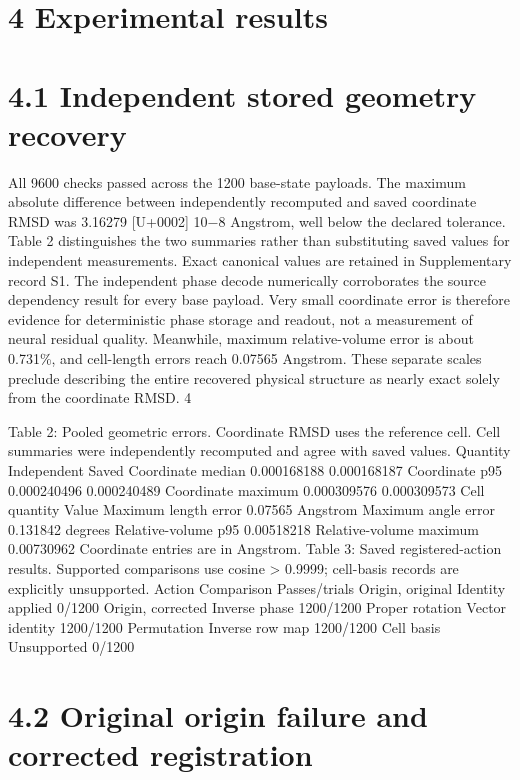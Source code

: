 \documentclass[11pt]{article}
\begin{document}
\section*{4 Experimental results}


\section*{4.1 Independent stored geometry recovery}

All 9600 checks passed across the 1200 base-state payloads. The maximum absolute difference
between independently recomputed and saved coordinate RMSD was 3.16279 [U+0002] 10\ensuremath{-}8 Angstrom,
well below the declared tolerance. Table 2 distinguishes the two summaries rather than substituting
saved values for independent measurements. Exact canonical values are retained in Supplementary
record S1.
The independent phase decode numerically corroborates the source dependency result for every
base payload. Very small coordinate error is therefore evidence for deterministic phase storage and
readout, not a measurement of neural residual quality. Meanwhile, maximum relative-volume error
is about 0.731\%, and cell-length errors reach 0.07565 Angstrom. These separate scales preclude
describing the entire recovered physical structure as nearly exact solely from the coordinate RMSD.
4

Table 2: Pooled geometric errors. Coordinate RMSD uses the reference cell. Cell summaries were
independently recomputed and agree with saved values.
Quantity Independent Saved
Coordinate median 0.000168188 0.000168187
Coordinate p95 0.000240496 0.000240489
Coordinate maximum 0.000309576 0.000309573
Cell quantity Value
Maximum length error 0.07565 Angstrom
Maximum angle error 0.131842 degrees
Relative-volume p95 0.00518218
Relative-volume maximum 0.00730962
Coordinate entries are in Angstrom.
Table 3: Saved registered-action results. Supported comparisons use cosine > 0.9999; cell-basis
records are explicitly unsupported.
Action Comparison Passes/trials
Origin, original Identity applied 0/1200
Origin, corrected Inverse phase 1200/1200
Proper rotation Vector identity 1200/1200
Permutation Inverse row map 1200/1200
Cell basis Unsupported 0/1200

\section*{4.2 Original origin failure and corrected registration}
\end{document}
